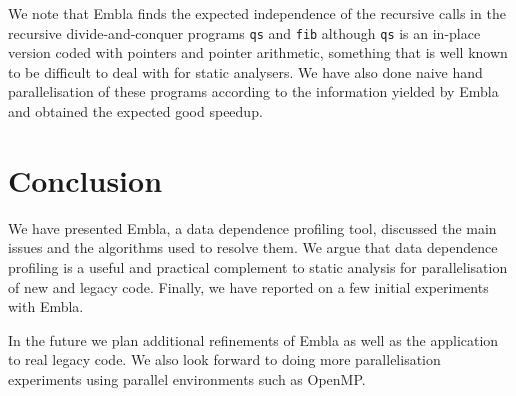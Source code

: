 \documentclass{acm_proc_article-sp}
\begin{document}
We note that Embla finds the expected independence of the recursive calls 
in the recursive divide-and-conquer programs {\tt qs} and
{\tt fib} although {\tt qs} is an in-place version coded 
with pointers and pointer arithmetic, something that is well known to be 
difficult to deal with for static analysers. We have also done naive
hand parallelisation of these programs according to the information 
yielded by Embla and obtained the expected good speedup.

\section{Conclusion}

We have presented Embla, a data dependence profiling tool, discussed the 
main issues and the algorithms used to resolve them. We argue that
data dependence profiling is a useful and practical complement to static
analysis for parallelisation of new and legacy code. Finally, we have 
reported on a few initial experiments with Embla.

In the future we plan additional refinements of Embla as well as the 
application to real legacy code. We also look forward to doing more
parallelisation experiments using parallel environments such as OpenMP.




\end{document}
